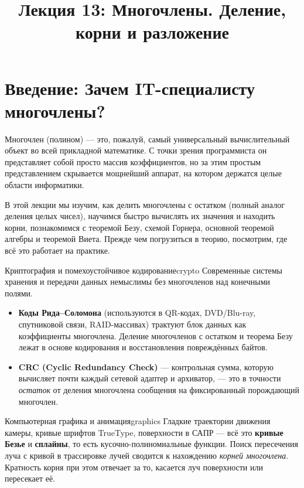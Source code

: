 \documentclass[12pt,a4paper]{article}
\title{Лекция 13: Многочлены. Деление, корни и разложение}
\author{}
\date{}
\begin{document}
\maketitle
\thispagestyle{fancy}

\section*{Введение: Зачем IT-специалисту многочлены?}

Многочлен (полином) — это, пожалуй, самый универсальный
вычислительный объект во всей прикладной математике. С точки зрения
программиста он представляет собой просто массив коэффициентов, но за
этим простым представлением скрывается мощнейший аппарат, на котором
держатся целые области информатики.

В этой лекции мы изучим, как делить многочлены с остатком (полный
аналог деления целых чисел), научимся быстро вычислять их значения и
находить корни, познакомимся с теоремой Безу, схемой Горнера, основной
теоремой алгебры и теоремой Виета. Прежде чем погрузиться в теорию,
посмотрим, где всё это работает на практике.

\begin{remarkIT}{Криптография и помехоустойчивое кодирование}{crypto}
  Современные системы хранения и передачи данных немыслимы без
  многочленов над конечными полями.
  \begin{itemize}
    \item \textbf{Коды Рида--Соломона} (используются в QR-кодах,
      DVD/Blu-ray, спутниковой связи, RAID-массивах) трактуют блок
      данных как коэффициенты многочлена. Деление многочленов с
      остатком и теорема Безу лежат в основе кодирования и
      восстановления повреждённых байтов.
    \item \textbf{CRC (Cyclic Redundancy Check)} — контрольная сумма,
      которую вычисляет почти каждый сетевой адаптер и архиватор, —
      это в точности \emph{остаток} от деления многочлена сообщения на
      фиксированный порождающий многочлен.
  \end{itemize}
\end{remarkIT}

\begin{remarkIT}{Компьютерная графика и анимация}{graphics}
  Гладкие траектории движения камеры, кривые шрифтов TrueType,
  поверхности в САПР — всё это \textbf{кривые Безье} и
  \textbf{сплайны}, то есть кусочно-полиномиальные функции. Поиск
  пересечения луча с кривой в трассировке лучей сводится к нахождению
  \emph{корней многочлена}. Кратность корня при этом отвечает за то,
  касается луч поверхности или пересекает её.
\end{remarkIT}
\end{document}
